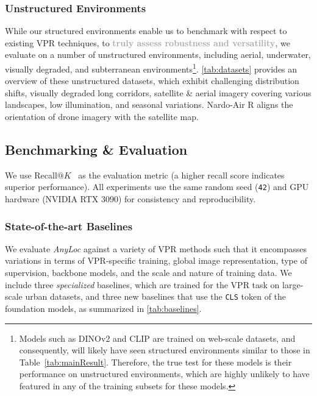 \documentclass[letterpaper, 10 pt, conference]{ieeeconf}  \fi
\newcommand{\highlight}[1]{\textcolor{darkgray}{\textbf{#1}}}
\newcommand{\coolname}{\textit{AnyLoc}}
\begin{document}
\subsubsection{Unstructured Environments}
\label{sec:unstructured_envs}

While our structured environments enable us to benchmark with respect to existing VPR techniques, to \highlight{truly assess robustness and versatility}, we evaluate on a number of unstructured environments, including aerial, underwater, visually degraded, and subterranean environments\footnote{Models such as DINOv2 and CLIP are trained on web-scale datasets, and consequently, will likely have seen structured environments similar to those in Table~\ref{tab:mainResult}. Therefore, the true test for these models is their performance on unstructured environments, which are highly unlikely to have featured in any of the training subsets for these models.}.
\cref{tab:datasets} provides an overview of these unstructured datasets, 
which exhibit challenging distribution shifts, visually degraded long corridors, satellite \& aerial imagery covering various landscapes, low illumination, and seasonal variations.
Nardo-Air R aligns the orientation of drone imagery with the satellite map.

\subsection{Benchmarking \& Evaluation}
\label{sec:benchmarking}


We use Recall$@K$~\cite{zaffar2021vpr} as the evaluation metric (a higher recall score indicates superior performance). All experiments use the same random seed  (\texttt{42}) and GPU hardware (NVIDIA RTX $3090$) for consistency and reproducibility.

\subsubsection{State-of-the-art Baselines}
\label{sec:baselines}
We evaluate \coolname{} against a variety of VPR methods such that it encompasses variations in terms of VPR-specific training, global image representation, type of supervision, backbone models, and the scale and nature of training data.
We include three \textit{specialized} baselines, which are trained for the VPR task on large-scale urban datasets, and three new baselines that use the \texttt{CLS} token of the foundation models, as summarized in \cref{tab:baselines}.
\end{document}
